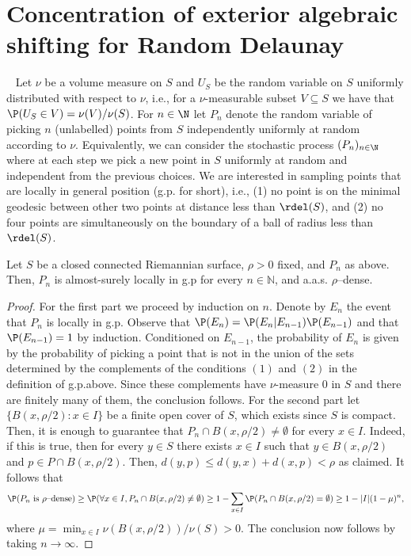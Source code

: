 \section{Concentration of exterior algebraic shifting for Random Delaunay}~\label{sec:assDelaunay}
Let $\nu$ be a volume measure on $S$ and $U_S$ be the random variable on $S$ uniformly distributed with respect to $\nu$, i.e., for a $\nu$-measurable subset $V\subseteq S$ we have that $\P(U_S\in V)=\nu(V)/\nu(S)$. For $n\in \N$ let $P_n$ denote the random variable of picking $n$ (unlabelled) points from $S$ independently uniformly at random according to $\nu$. Equivalently, we can consider the stochastic process $(P_n)_{n\in \N}$ where at each step we pick a new point in $S$ uniformly at random and independent from the previous choices. We are interested in sampling points that are locally in general position (g.p. for short), i.e., (1) no point is on the minimal geodesic between other two points at distance less
than $\rdel(S)$, and (2) no four points are simultaneously on the boundary of a ball of radius less than $\rdel(S)$.
\begin{lemma}
  \label{l:genericdense}
  Let $S$ be a closed connected Riemannian surface, $\rho>0$ fixed, and $P_n$ as above. Then,  
   $P_n$ is almost-surely locally in g.p for every $n\in \mathbb N$, and a.a.s. $\rho$--dense.
\end{lemma}
\begin{proof}
  For the first part we proceed by induction on $n$. Denote by $E_n$ the event that $P_n$ is locally in g.p. Observe that $\P(E_n)=\P(E_n|E_{n-1})\P(E_{n-1})$ and that $\P(E_{n-1})=1$ by induction. Conditioned on $E_{n-1}$, the probability of $E_n$ is given by the probability of picking a point that is not in the union of the sets determined by the complements of the conditions $(1)$ and $(2)$ in the definition of g.p.above. Since these complements have $\nu$-measure $0$ in $S$ and there are finitely many of them, the conclusion follows.
%
  For the second part let $\{B(x,\rho/2)\colon x\in I\}$ be a finite open cover of $S$, which exists since $S$ is compact. Then, it is enough to guarantee that $P_n\cap B(x,\rho/2)\neq \emptyset$ for every $x\in I$. Indeed, if this is true, then for every $y\in S$ there exists $x\in I$ such that $y\in B(x,\rho/2)$ and $p\in P\cap B(x,\rho/2)$. Then, $d(y,p)\leq d(y,x)+d(x,p)<\rho$ as claimed. It follows that
  $$\P(P_n~\text{is $\rho$--dense}) \geq \P(\forall x\in I, P_n\cap B(x,\rho/2)\neq \emptyset) \geq 1 - \sum_{x\in I}\P(P_n\cap B(x,\rho/2)=\emptyset) 
                         \geq 1-|I|(1-\mu)^n,
  $$
  where 
  $ \mu = \min_{x\in I} \nu(B(x,\rho/2))/\nu(S)>0$. 
  The conclusion now follows by taking $n\to \infty$.
\end{proof}
